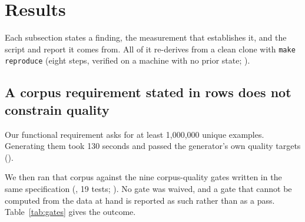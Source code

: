 %

\section{Results}
\label{sec:results}

Each subsection states a finding, the measurement that establishes it, and the
script and report it comes from. All of it re-derives from a clean clone with
\texttt{make reproduce} (eight steps, verified on a machine with no prior state;
).

\subsection{A corpus requirement stated in rows does not constrain quality}
\label{sec:res:seeds}

Our functional requirement asks for at least 1{,}000{,}000 unique examples.
Generating them took 130 seconds and passed the generator's own quality targets
().

We then ran that corpus against the nine corpus-quality gates written in the same
specification (, 19 tests;
). No gate was waived, and a gate that
cannot be computed from the data at hand is reported as such rather than as a
pass. Table~\ref{tab:gates} gives the outcome.

